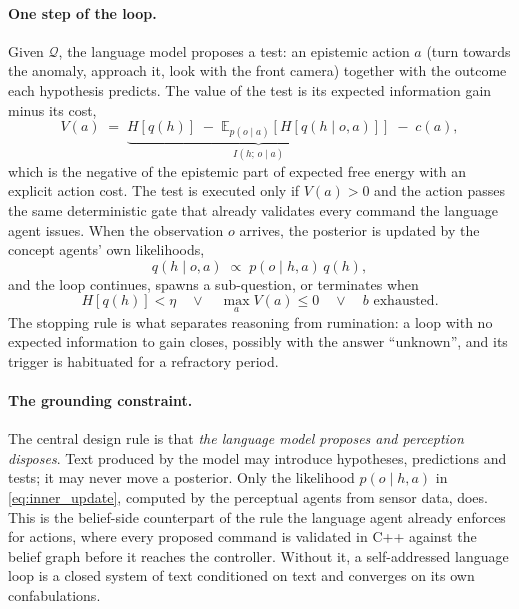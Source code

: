\paragraph{One step of the loop.}
Given $\mathcal{Q}$, the language model proposes a test: an epistemic action $a$ (turn towards the anomaly,
approach it, look with the front camera) together with the outcome each hypothesis predicts. The value of the test
is its expected information gain minus its cost,
\begin{equation}
    V(a) \;=\; \underbrace{H\!\left[q(h)\right] \;-\; \mathbb{E}_{p(o \mid a)}\!\left[ H\!\left[q(h \mid o, a)\right]
    \right]}_{I(h;\,o \mid a)} \;-\; c(a),
    \label{eq:inner_value}
\end{equation}
which is the negative of the epistemic part of expected free energy with an explicit action cost. The test is
executed only if $V(a) > 0$ and the action passes the same deterministic gate that already validates every
command the language agent issues. When the observation $o$ arrives, the posterior is updated by the concept
agents' own likelihoods,
\begin{equation}
    q(h \mid o, a) \;\propto\; p(o \mid h, a)\, q(h),
    \label{eq:inner_update}
\end{equation}
and the loop continues, spawns a sub-question, or terminates when
\begin{equation}
    H\!\left[q(h)\right] < \eta \quad\lor\quad \max_a V(a) \le 0 \quad\lor\quad b \text{ exhausted}.
    \label{eq:inner_stop}
\end{equation}
The stopping rule is what separates reasoning from rumination: a loop with no expected information to gain closes,
possibly with the answer ``unknown'', and its trigger is habituated for a refractory period.

\paragraph{The grounding constraint.}
The central design rule is that \emph{the language model proposes and perception disposes}. Text produced by the
model may introduce hypotheses, predictions and tests; it may never move a posterior. Only the likelihood
$p(o \mid h, a)$ in \eqref{eq:inner_update}, computed by the perceptual agents from sensor data, does. This is the
belief-side counterpart of the rule the language agent already enforces for actions, where every proposed command
is validated in C++ against the belief graph before it reaches the controller. Without it, a self-addressed
language loop is a closed system of text conditioned on text and converges on its own confabulations.

